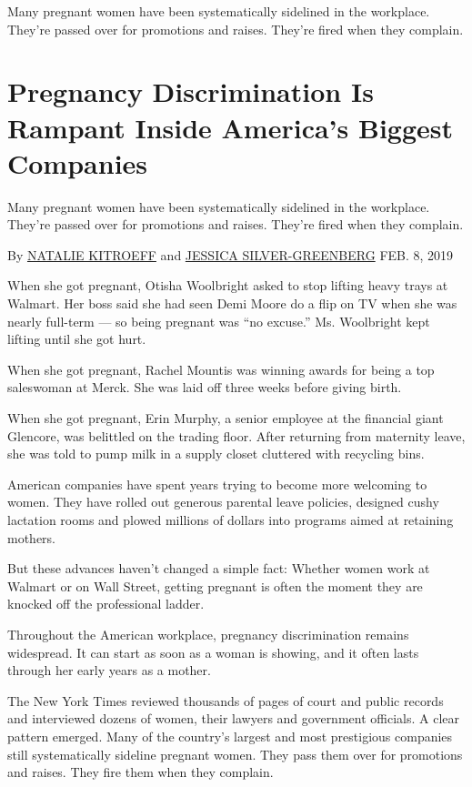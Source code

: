 Many pregnant women have been systematically sidelined in the workplace.
They're passed over for promotions and raises. They're fired when they
complain.

\hypertarget{pregnancy-discrimination-is-rampant-inside-americas-biggest-companies-1}{%
\section{Pregnancy Discrimination Is Rampant Inside America's Biggest
Companies}\label{pregnancy-discrimination-is-rampant-inside-americas-biggest-companies-1}}

Many pregnant women have been systematically sidelined in the workplace.
They're passed over for promotions and raises. They're fired when they
complain.

By \href{https://www.nytimes3xbfgragh.onion/by/natalie-kitroeff}{NATALIE
KITROEFF} and
\href{https://www.nytimes3xbfgragh.onion/by/jessica-silver-greenberg}{JESSICA
SILVER-GREENBERG} FEB. 8, 2019

When she got pregnant, Otisha Woolbright asked to stop lifting heavy
trays at Walmart. Her boss said she had seen Demi Moore do a flip on TV
when she was nearly full-term --- so being pregnant was ``no excuse.''
Ms. Woolbright kept lifting until she got hurt.

When she got pregnant, Rachel Mountis was winning awards for being a top
saleswoman at Merck. She was laid off three weeks before giving birth.

When she got pregnant, Erin Murphy, a senior employee at the financial
giant Glencore, was belittled on the trading floor. After returning from
maternity leave, she was told to pump milk in a supply closet cluttered
with recycling bins.

American companies have spent years trying to become more welcoming to
women. They have rolled out generous parental leave policies, designed
cushy lactation rooms and plowed millions of dollars into programs aimed
at retaining mothers.

But these advances haven't changed a simple fact: Whether women work at
Walmart or on Wall Street, getting pregnant is often the moment they are
knocked off the professional ladder.

Throughout the American workplace, pregnancy discrimination remains
widespread. It can start as soon as a woman is showing, and it often
lasts through her early years as a mother.

The New York Times reviewed thousands of pages of court and public
records and interviewed dozens of women, their lawyers and government
officials. A clear pattern emerged. Many of the country's largest and
most prestigious companies still systematically sideline pregnant women.
They pass them over for promotions and raises. They fire them when they
complain.

